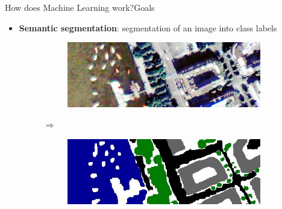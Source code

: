 \documentclass{beamer}
\begin{document}
\begin{frame}{How does Machine Learning work?}{Goals}
\begin{itemize}
\begin{figure}[H]
\begin{subfigure}{.1\textwidth}
		\end{subfigure} $\Rightarrow$ ``7''
	\end{figure}\pause
	\item \textbf{Semantic segmentation}: segmentation of an image into class labels
	\begin{figure}[H]
		\begin{subfigure}{0.38\textwidth}
			\centering
			\includegraphics[width=\textwidth]{Im_11_detail.jpg}
		\end{subfigure} $\Rightarrow$
		\begin{subfigure}{0.38\textwidth}
			\centering
			\includegraphics[width=\textwidth]{GT_11_detail.jpg}
		\end{subfigure}
	\end{figure}
\end{itemize}
\end{frame}
\end{document}
